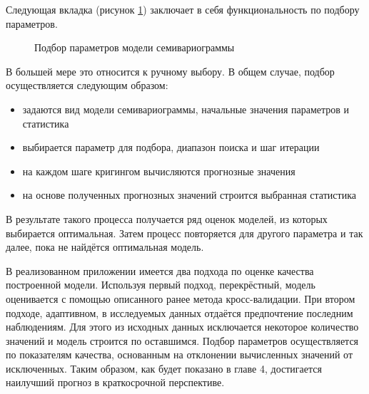 Следующая вкладка (рисунок \ref{img:mod_fit}) заключает в себя функциональность по подбору параметров.
\begin{figure}[ht]
\caption{Подбор параметров модели семивариограммы}
\label{img:mod_fit}
\end{figure}
В большей мере это относится к ручному выбору. В общем случае, подбор осуществляется следующим образом:
\begin{itemize}
	\item задаются вид модели семивариограммы, начальные значения параметров и статистика
	\item выбирается параметр для подбора, диапазон поиска и шаг итерации
	\item на каждом шаге кригингом вычисляются прогнозные значения
	\item на основе полученных прогнозных значений строится выбранная статистика
\end{itemize}
В результате такого процесса получается ряд оценок моделей, из которых выбирается оптимальная. Затем процесс повторяется для другого параметра и так далее, пока не найдётся оптимальная модель.

В реализованном приложении имеется два подхода по оценке качества построенной модели. Используя первый подход, перекрёстный, модель оценивается с помощью описанного ранее метода кросс-валидации. При втором подходе, адаптивном, в исследуемых данных отдаётся предпочтение последним наблюдениям. Для этого из исходных данных исключается некоторое количество значений и модель строится по оставшимся. Подбор параметров осуществляется по показателям качества, основанным на отклонении вычисленных значений от исключенных. Таким образом, как будет показано в главе 4, достигается наилучший прогноз в краткосрочной перспективе.


